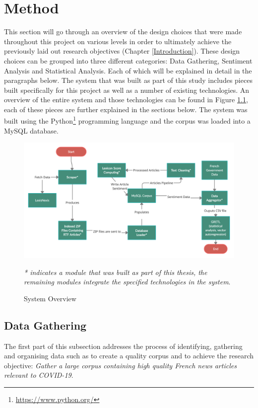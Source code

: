 \chapter{Method}\label{Method}

This section will go through an overview of the design choices that were made throughout this project on various levels in order to ultimately achieve the previously laid out research objectives (Chapter \ref{Introduction}). These design choices can be grouped into three different categories: Data Gathering, Sentiment Analysis and Statistical Analysis. Each of which will be explained in detail in the paragraphs below. The system that was built as part of this study includes pieces built specifically for this project as well as a number of existing technologies. An overview of the entire system and those technologies can be found in Figure \ref{system figure}, each of these pieces are further explained in the sections below. The system was built using the Python\footnote{\url{https://www.python.org/}} programming language and the corpus was loaded into a MySQL database.


\begin{figure}[h!]
      \centering
      \includegraphics[scale=0.23]{method/system_1.png}
      \caption{System Overview}
      \label{system figure}
      \emph{* indicates a module that was built as part of this thesis, the remaining modules integrate the specified technologies in the system}.
\end{figure}

\section{Data Gathering}

The first part of this subsection addresses the process of identifying, gathering and organising data such as to create a quality corpus and to achieve the research objective: \emph{Gather a large corpus containing high quality French news articles relevant to COVID-19}.

